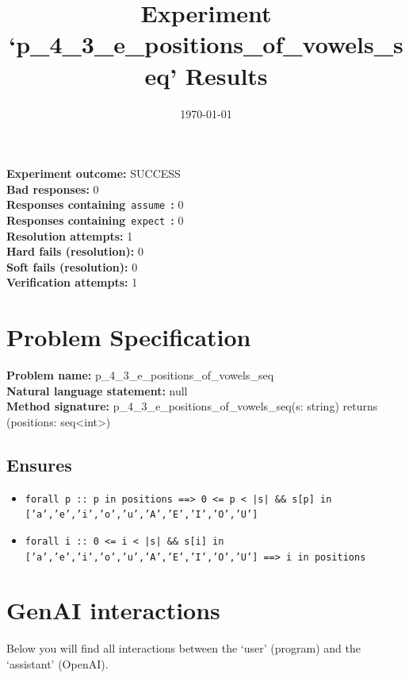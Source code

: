\documentclass{article}
\begin{document}
\title{Experiment `p\_4\_3\_e\_positions\_of\_vowels\_seq' Results}
\author{\today}
\date{}
\maketitle
\textbf{Experiment outcome: }SUCCESS
\\\textbf{Bad responses: }0
\\\textbf{Responses containing}~\texttt{assume}~\textbf{: }0
\\\textbf{Responses containing}~\texttt{expect}~\textbf{: }0
\\\textbf{Resolution attempts: }1
\\\textbf{Hard fails (resolution): }0
\\\textbf{Soft fails (resolution): }0
\\\textbf{Verification attempts: }1
\section*{Problem Specification}
\textbf{Problem name: }p\_4\_3\_e\_positions\_of\_vowels\_seq
\\\textbf{Natural language statement: }null
\\\textbf{Method signature: }p\_4\_3\_e\_positions\_of\_vowels\_seq(s: string) returns (positions: seq<int>)
\subsection*{Ensures}
\begin{itemize}
\item \texttt{forall p :: p in positions ==> 0 <= p < |s| \&\& s[p] in ['a','e','i','o','u','A','E','I','O','U']}
\item \texttt{forall i :: 0 <= i < |s| \&\& s[i] in ['a','e','i','o','u','A','E','I','O','U'] ==> i in positions}
\end{itemize}
\clearpage
\section*{GenAI interactions}
Below you will find all interactions between the `user' (program) and the `assistant' (OpenAI).
\end{document}
